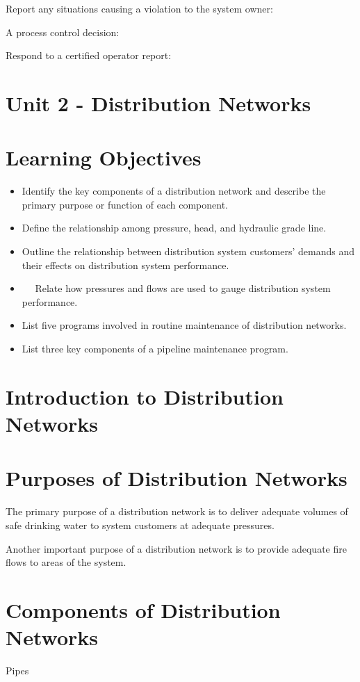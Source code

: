 \documentclass[10pt]{article}
\begin{document}
Report any situations causing a violation to the system owner:

A process control decision:

Respond to a certified operator report:

\section{Unit 2 - Distribution Networks}
\section{Learning Objectives}
\begin{itemize}
  \item Identify the key components of a distribution network and describe the primary purpose or function of each component.

  \item Define the relationship among pressure, head, and hydraulic grade line.

  \item Outline the relationship between distribution system customers' demands and their effects on distribution system performance.

  \item $\quad$ Relate how pressures and flows are used to gauge distribution system performance.

  \item List five programs involved in routine maintenance of distribution networks.

  \item List three key components of a pipeline maintenance program.

\end{itemize}
\section{Introduction to Distribution Networks}
\section{Purposes of Distribution Networks}
The primary purpose of a distribution network is to deliver adequate volumes of safe drinking water to system customers at adequate pressures.

Another important purpose of a distribution network is to provide adequate fire flows to areas of the system.

\section{Components of Distribution Networks}
Pipes
\end{document}

